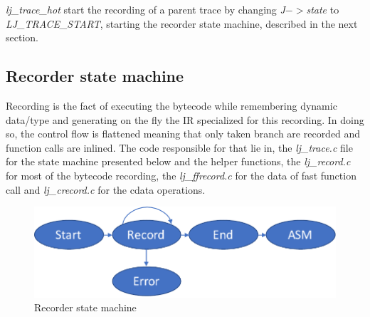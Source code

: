 \emph{lj\_trace\_hot} start the recording of a parent trace by changing
\emph{J$->$state} to \emph{LJ\_TRACE\_START}, starting the recorder state
machine, described in the next section.



\subsection{Recorder state machine}
\label{Subsec:recorder-state-machine}

Recording is the fact of executing the bytecode while remembering dynamic
data/type and generating on the fly the IR specialized for this recording. In
doing so, the control flow is flattened meaning that only taken branch are
recorded and function calls are inlined. The code responsible for that lie in, the
\emph{lj\_trace.c} file for the state machine presented below and the helper
functions, the \emph{lj\_record.c} for most of the bytecode recording,
the \emph{lj\_ffrecord.c} for the data of fast function call and
\emph{lj\_crecord.c} for the cdata operations.

\begin{figure}[H]
    \centering
	\includegraphics[width=\textwidth]{./Images/FSM.pdf}
    \caption{Recorder state machine}
    \label{fig:recorder-state-machine}
\end{figure}


